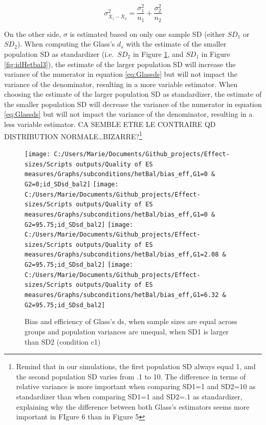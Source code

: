 \documentclass[
  man,floatsintext]{apa6}
\begin{document}
\begin{equation} 
\sigma^2_{\bar{X}_1-\bar{X}_2}=\frac{\sigma^2_1}{n_1}+\frac{\sigma^2_2}{n_2}
\label{eq:sdmeandiff}
\end{equation}

On the other side, \(\sigma\) is estimated based on only one sample SD (either \(SD_1\) or \(SD_2\)). When computing the Glass's \(d_s\) with the estimate of the smaller population SD as standardizer (i.e.~\(SD_2\) in Figure \ref{fig:idHetbal2}, and \(SD_1\) in Figure \ref{fig:idHetbal3}), the estimate of the larger population SD will increase the variance of the numerator in equation \ref{eq:Glassds} but will not impact the variance of the denominator, resulting in a more variable estimator. When choosing the estimate of the larger population SD as standardizer, the estimate of the smaller population SD will decrease the variance of the numerator in equation \ref{eq:Glassds} but will not impact the variance of the denominator, resulting in a less variable estimator. CA SEMBLE ETRE LE CONTRAIRE QD DISTRIBUTION NORMALE\ldots BIZARRE?\footnote{Remind that in our simulations, the first population SD always equal 1, and the second population SD varies from .1 to 10. The difference in terms of relative variance is more important when comparing SD1=1 and SD2=10 as standardizer than when comparing SD1=1 and SD2=.1 as standardizer, explaining why the difference between both Glass's estimators seems more important in FIgure 6 than in Figure 5}

\begin{figure}

{\centering \texttt{[image: C:/Users/Marie/Documents/Github\_projects/Effect-sizes/Scripts outputs/Quality of ES measures/Graphs/subconditions/hetBal/bias\_eff,G1=0 \& G2=0;id\_SDsd\_bal2]} \texttt{[image: C:/Users/Marie/Documents/Github\_projects/Effect-sizes/Scripts outputs/Quality of ES measures/Graphs/subconditions/hetBal/bias\_eff,G1=0 \& G2=95.75;id\_SDsd\_bal2]} \texttt{[image: C:/Users/Marie/Documents/Github\_projects/Effect-sizes/Scripts outputs/Quality of ES measures/Graphs/subconditions/hetBal/bias\_eff,G1=2.08 \& G2=95.75;id\_SDsd\_bal2]} \texttt{[image: C:/Users/Marie/Documents/Github\_projects/Effect-sizes/Scripts outputs/Quality of ES measures/Graphs/subconditions/hetBal/bias\_eff,G1=6.32 \& G2=95.75;id\_SDsd\_bal2]} 

}

\caption{Bias and efficiency of Glass's ds, when sample sizes are equal across groups and population variances are unequal, when SD1 is larger than SD2 (condition c1)}\label{fig:idHetbal2}
\end{figure}
\end{document}
